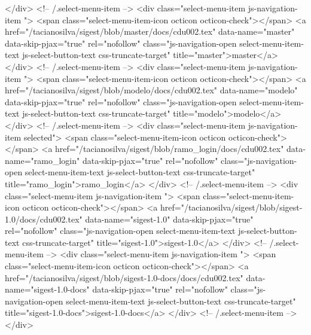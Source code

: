             </div> <!-- /.select-menu-item -->
            <div class="select-menu-item js-navigation-item ">
              <span class="select-menu-item-icon octicon octicon-check"></span>
              <a href="/tacianosilva/sigest/blob/master/docs/cdu002.tex"
                 data-name="master"
                 data-skip-pjax="true"
                 rel="nofollow"
                 class="js-navigation-open select-menu-item-text js-select-button-text css-truncate-target"
                 title="master">master</a>
            </div> <!-- /.select-menu-item -->
            <div class="select-menu-item js-navigation-item ">
              <span class="select-menu-item-icon octicon octicon-check"></span>
              <a href="/tacianosilva/sigest/blob/modelo/docs/cdu002.tex"
                 data-name="modelo"
                 data-skip-pjax="true"
                 rel="nofollow"
                 class="js-navigation-open select-menu-item-text js-select-button-text css-truncate-target"
                 title="modelo">modelo</a>
            </div> <!-- /.select-menu-item -->
            <div class="select-menu-item js-navigation-item selected">
              <span class="select-menu-item-icon octicon octicon-check"></span>
              <a href="/tacianosilva/sigest/blob/ramo_login/docs/cdu002.tex"
                 data-name="ramo_login"
                 data-skip-pjax="true"
                 rel="nofollow"
                 class="js-navigation-open select-menu-item-text js-select-button-text css-truncate-target"
                 title="ramo_login">ramo_login</a>
            </div> <!-- /.select-menu-item -->
            <div class="select-menu-item js-navigation-item ">
              <span class="select-menu-item-icon octicon octicon-check"></span>
              <a href="/tacianosilva/sigest/blob/sigest-1.0/docs/cdu002.tex"
                 data-name="sigest-1.0"
                 data-skip-pjax="true"
                 rel="nofollow"
                 class="js-navigation-open select-menu-item-text js-select-button-text css-truncate-target"
                 title="sigest-1.0">sigest-1.0</a>
            </div> <!-- /.select-menu-item -->
            <div class="select-menu-item js-navigation-item ">
              <span class="select-menu-item-icon octicon octicon-check"></span>
              <a href="/tacianosilva/sigest/blob/sigest-1.0-docs/docs/cdu002.tex"
                 data-name="sigest-1.0-docs"
                 data-skip-pjax="true"
                 rel="nofollow"
                 class="js-navigation-open select-menu-item-text js-select-button-text css-truncate-target"
                 title="sigest-1.0-docs">sigest-1.0-docs</a>
            </div> <!-- /.select-menu-item -->
        </div>

